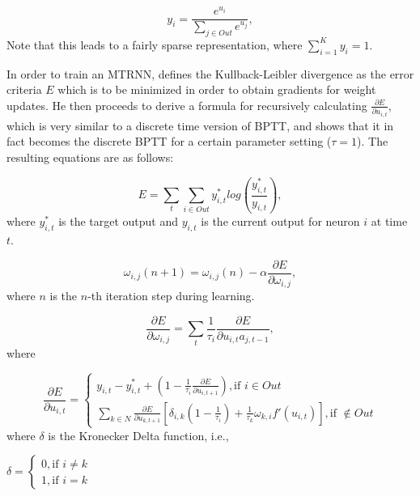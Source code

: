 \begin{equation}\label{tani_softmax}
    y_i = \frac{e^{u_i}}{\sum_{j \in Out}^{}{e^{u_j}}},
\end{equation}
Note that this leads to a fairly sparse representation, where $\sum_{i=1}^{K} y_i = 1$.

In order to train an MTRNN, \cite{Tani2014} defines the Kullback-Leibler divergence as the error criteria $E$ which is to be minimized in order to obtain gradients for weight updates. He then proceeds to derive a formula for recursively calculating $\frac{\partial E}{\partial u_{i,t}}$, which is very similar to a discrete time version of BPTT, and shows that it in fact becomes the discrete BPTT for a certain parameter setting ($\tau=1$). The resulting equations are as follows:

\begin{equation}\label{Kullback_Leibler_divergence}
    E = \sum_t \sum_{i \in Out} y_{i,t}^* log(\frac{y_{i,t}^*}{y_{i,t}}),
\end{equation}
where $y_{i,t}^*$ is the target output and $y_{i,t}$ is the current output for neuron $i$ at time $t$.

\begin{equation}
    \omega_{i,j}(n+1) = \omega_{i,j}(n) - \alpha\frac{\partial E}{\partial \omega_{i,j}},
\end{equation}
where $n$ is the $n$-th iteration step during learning.

\begin{equation}
    \frac{\partial E}{\partial \omega_{i,j}} = \sum_{t} \frac{1}{\tau_i}\frac{\partial E}{\partial u_{i,t}a_{j,t-1}},
\end{equation}
where

\begin{equation}
    \frac{\partial E}{\partial u_{i,t}} = \begin{cases}
        y_{i,t} - y_{i,t}^* + (1-\frac{1}{\tau_i} \frac{\partial E}{\partial u_{i,t+1}}), \text{if $i \in Out$} \\
        \sum_{k \in N}\frac{\partial E}{\partial u_{k,t+1}}[\delta_{i,k}(1-\frac{1}{\tau_i})+\frac{1}{\tau_k}\omega_{k,i}f'(u_{i,t})], \text{if $\notin Out$}
   \end{cases}
\end{equation}
where $\delta$ is the Kronecker Delta function, i.e.,

\begin{center}
\begin{math}
    \delta = \begin{cases}
        0, \text{if $i \neq k$} \\
        1, \text{if $i = k$}
    \end{cases}
\end{math}
\end{center}

